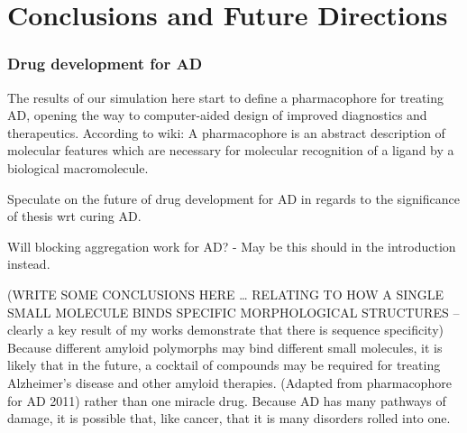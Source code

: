 




\chapter{Conclusions and Future Directions}




\subsection{Drug development for AD}

The results of our simulation here start to define a pharmacophore for treating AD, opening the way to computer-aided design of improved diagnostics and therapeutics.
According to wiki: A pharmacophore is an abstract description of molecular features which are necessary for molecular recognition of a ligand by a biological macromolecule.

Speculate on the future of drug development for AD in regards to the significance of thesis wrt curing AD.

Will blocking aggregation work for AD? - May be this should in the introduction instead.

(WRITE SOME CONCLUSIONS HERE … RELATING TO HOW A SINGLE SMALL MOLECULE BINDS SPECIFIC MORPHOLOGICAL STRUCTURES -- clearly a key result of my works demonstrate that there is sequence specificity) Because different amyloid polymorphs may bind different small molecules, it is likely that in the future, a cocktail of compounds may be required for treating Alzheimer’s disease and other amyloid therapies. (Adapted from pharmacophore for AD 2011) rather than one  miracle drug. Because AD has many pathways of damage, it is possible that, like cancer, that it is many disorders rolled into one. %

